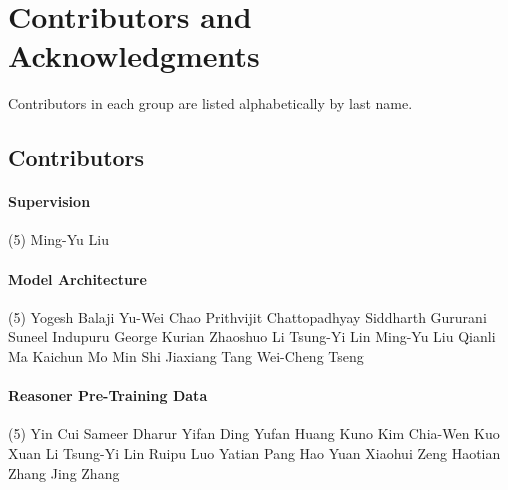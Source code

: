 \newpage
\section{Contributors and Acknowledgments}
\label{sec::contributors}

Contributors in each group are listed alphabetically by last name.

\subsection{Contributors}

\paragraph{Supervision} \mbox{}
\vspace{-0.32\baselineskip}
\begingroup
\footnotesize
\begin{tasks}[label=\relax, label-width=0pt, item-indent=4pt](5)
\task Ming-Yu Liu
\end{tasks}
\endgroup

\paragraph{Model Architecture} \mbox{}
\vspace{-0.32\baselineskip}
\begingroup
\footnotesize
\begin{tasks}[label=\relax, label-width=0pt, item-indent=4pt](5)
\task Yogesh Balaji
\task Yu-Wei Chao 
\task Prithvijit Chattopadhyay
\task Siddharth Gururani
\task Suneel Indupuru
\task George Kurian
\task Zhaoshuo Li 
\task Tsung-Yi Lin
\task Ming-Yu Liu
\task Qianli Ma
\task Kaichun Mo 
\task Min Shi
\task Jiaxiang Tang 
\task Wei-Cheng Tseng 
\end{tasks}
\endgroup

\paragraph{Reasoner Pre-Training Data} \mbox{}
\vspace{-0.32\baselineskip}
\begingroup
\footnotesize
\begin{tasks}[label=\relax, label-width=0pt, item-indent=4pt](5)
\task Yin Cui 
\task Sameer Dharur 
\task Yifan Ding 
\task Yufan Huang 
\task Kuno Kim 
\task Chia-Wen Kuo 
\task Xuan Li 
\task Tsung-Yi Lin 
\task Ruipu Luo 
\task Yatian Pang 
\task Hao Yuan 
\task Xiaohui Zeng 
\task Haotian Zhang 
\task Jing Zhang 
\end{tasks}
\endgroup

